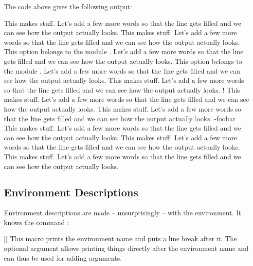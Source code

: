 \documentclass[load-preamble+]{cnltx-doc}
\begin{document}
The code above gives the following output:
\begin{options}
    This makes stuff.  Let's add a few more words so that the line gets
    filled and we can see how the output actually looks.
    This makes stuff.  Let's add a few more words so that the line gets
    filled and we can see how the output actually looks.
    This option belongs to the module .  Let's add a few more
    words so that the line gets filled and we can see how the output actually
    looks.
    This option belongs to the module .  Let's add a few more
    words so that the line gets filled and we can see how the output actually
    looks.
  \Default
    This makes stuff.  Let's add a few more words so that the line gets
    filled and we can see how the output actually looks.
  \Default!
    This makes stuff.  Let's add a few more words so that the line gets
    filled and we can see how the output actually looks.
    This makes stuff.  Let's add a few more words so that the line gets
    filled and we can see how the output actually looks.
  \keyval-{foo}{bar}
    This makes stuff.  Let's add a few more words so that the line gets
    filled and we can see how the output actually looks.
    This makes stuff.  Let's add a few more words so that the line gets
    filled and we can see how the output actually looks.
    This makes stuff.  Let's add a few more words so that the line gets
    filled and we can see how the output actually looks.
\end{options}

\subsection{Environment Descriptions}\label{sec:usage:environments}
Environment descriptions are made -- unsurprisingly -- with the
 environment.  It knows the command :

\begin{commands}
  [\sarg{}]
    This macro prints the environment name and puts a line break
    after it.  The optional argument allows printing things directly after the
    environment name and can thus be used for adding arguments.
\end{commands}
\end{document}
